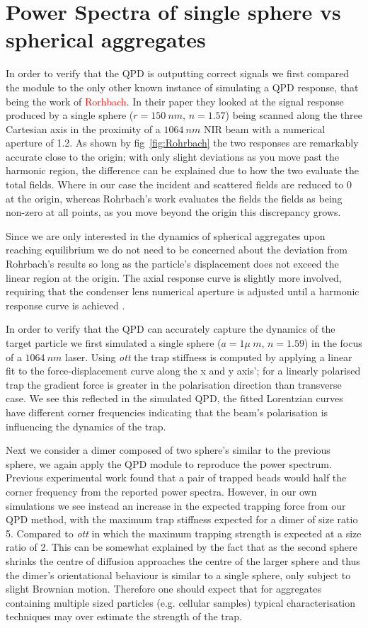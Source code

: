 \section{Power Spectra of single sphere vs spherical aggregates}
In order to verify that the QPD is outputting correct signals we first compared the module to the only other known instance of simulating a QPD response, that being the work of \textcolor{red}{Rorhbach}. In their paper they looked at the signal response produced by a single sphere ($r = 150\ nm$, $n = 1.57$) being scanned along the three Cartesian axis in the proximity 
of a $1064\ nm$ NIR beam with a numerical aperture of 1.2. As shown by fig~\ref{fig:Rohrbach} the two responses are remarkably accurate close to the origin; with only slight deviations as you move past the harmonic region, the difference can be explained due to how the two evaluate the total fields. Where in our case the incident and scattered fields are reduced to 0 at the origin, whereas Rohrbach's work evaluates the fields the fields as being non-zero at all points, as you move beyond the origin this discrepancy grows. 

Since we are only interested in the dynamics of spherical aggregates upon reaching equilibrium we do not need to be concerned about the deviation from Rohrbach's results so long as the particle's displacement does not exceed the linear region at the origin. The axial response curve is slightly more involved, requiring that the condenser lens numerical aperture is adjusted until a harmonic response curve is achieved \cite{Friedrich2012}. 

In order to verify that the QPD can accurately capture the dynamics of the target particle we first simulated a single sphere ($a = 1\mu\ m$, $n=1.59$) in the focus of a $1064\ nm$ laser. Using \textit{ott} the trap stiffness is computed by applying a linear fit to the force-displacement curve along the x and y axis'; for a linearly polarised trap the gradient force is greater in the polarisation direction than transverse case. We see this reflected in the simulated QPD, the fitted Lorentzian curves have different corner frequencies indicating that the beam's polarisation is influencing the dynamics of the trap. 

Next we consider a dimer composed of two sphere's similar to the previous sphere, we again apply the QPD module to reproduce the power spectrum. Previous experimental work found that a pair of trapped beads would half the corner frequency from the reported power spectra. However, in our own simulations we see instead an increase in the expected trapping force from our QPD method, with the maximum trap stiffness expected for a dimer of size ratio 5. Compared to \textit{ott} in which the maximum trapping strength is expected at a size ratio of 2. This can be somewhat explained by the fact that as the second sphere shrinks the centre of diffusion approaches the centre of the larger sphere and thus the dimer's orientational behaviour is similar to a single sphere, only subject to slight Brownian motion. Therefore one should expect that for aggregates containing multiple sized particles (e.g. cellular samples) typical characterisation techniques may over estimate the strength of the trap.

